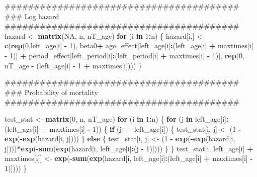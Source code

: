 \documentclass[11pt,]{article}
\newenvironment{Shaded}{\begin{snugshade}}{\end{snugshade}}
\newcommand{\KeywordTok}[1]{\textcolor[rgb]{0.13,0.29,0.53}{\textbf{#1}}}
\newcommand{\DecValTok}[1]{\textcolor[rgb]{0.00,0.00,0.81}{#1}}
\newcommand{\StringTok}[1]{\textcolor[rgb]{0.31,0.60,0.02}{#1}}
\newcommand{\OtherTok}[1]{\textcolor[rgb]{0.56,0.35,0.01}{#1}}
\newcommand{\ControlFlowTok}[1]{\textcolor[rgb]{0.13,0.29,0.53}{\textbf{#1}}}
\newcommand{\OperatorTok}[1]{\textcolor[rgb]{0.81,0.36,0.00}{\textbf{#1}}}
\newcommand{\NormalTok}[1]{#1}
\begin{document}
\begin{Shaded}
\begin{Highlighting}[]
\NormalTok{  ########################################}
\NormalTok{  ### Log hazard}
\NormalTok{  ########################################}
\NormalTok{  hazard <-}\StringTok{ }\KeywordTok{matrix}\NormalTok{(}\OtherTok{NA}\NormalTok{, n, nT_age)}
  \ControlFlowTok{for}\NormalTok{ (i }\ControlFlowTok{in} \DecValTok{1}\OperatorTok{:}\NormalTok{n) \{}
\NormalTok{    hazard[i,] <-}\StringTok{ }\KeywordTok{c}\NormalTok{(}\KeywordTok{rep}\NormalTok{(}\DecValTok{0}\NormalTok{,left_age[i] }\OperatorTok{-}\StringTok{ }\DecValTok{1}\NormalTok{), beta0}\OperatorTok{+}
\StringTok{                      }\NormalTok{age_effect[left_age[i]}\OperatorTok{:}\NormalTok{(left_age[i] }\OperatorTok{+}\StringTok{ }\NormalTok{maxtimes[i] }\OperatorTok{-}\StringTok{ }\DecValTok{1}\NormalTok{)] }\OperatorTok{+}
\StringTok{                      }\NormalTok{period_effect[left_period[i]}\OperatorTok{:}\NormalTok{(left_period[i] }\OperatorTok{+}\StringTok{ }\NormalTok{maxtimes[i] }\OperatorTok{-}\StringTok{ }\DecValTok{1}\NormalTok{)],}
                      \KeywordTok{rep}\NormalTok{(}\DecValTok{0}\NormalTok{, nT_age }\OperatorTok{-}\StringTok{ }\NormalTok{(left_age[i] }\OperatorTok{-}\StringTok{ }\DecValTok{1} \OperatorTok{+}\StringTok{ }\NormalTok{maxtimes[i])))}
\NormalTok{  \}}

\NormalTok{  ########################################}
\NormalTok{  ### Probability of mortality}
\NormalTok{  ########################################}

\NormalTok{  test_stat <-}\StringTok{ }\KeywordTok{matrix}\NormalTok{(}\DecValTok{0}\NormalTok{, n, nT_age)}
  \ControlFlowTok{for}\NormalTok{ (i }\ControlFlowTok{in} \DecValTok{1}\OperatorTok{:}\NormalTok{n) \{}
    \ControlFlowTok{for}\NormalTok{ (j }\ControlFlowTok{in}\NormalTok{ left_age[i]}\OperatorTok{:}\NormalTok{(left_age[i] }\OperatorTok{+}\StringTok{ }\NormalTok{maxtimes[i] }\OperatorTok{-}\StringTok{ }\DecValTok{1}\NormalTok{)) \{}
      \ControlFlowTok{if}\NormalTok{ (j}\OperatorTok{==}\NormalTok{left_age[i]) \{}
\NormalTok{        test_stat[i, j] <-}\StringTok{ }\NormalTok{(}\DecValTok{1} \OperatorTok{-}\StringTok{ }\KeywordTok{exp}\NormalTok{(}\OperatorTok{-}\KeywordTok{exp}\NormalTok{(hazard[i, j])))}
\NormalTok{      \} }\ControlFlowTok{else}\NormalTok{ \{}
\NormalTok{        test_stat[i, j] <-}
\StringTok{          }\NormalTok{(}\DecValTok{1} \OperatorTok{-}\StringTok{ }\KeywordTok{exp}\NormalTok{(}\OperatorTok{-}\KeywordTok{exp}\NormalTok{(hazard[i, j])))}\OperatorTok{*}\KeywordTok{exp}\NormalTok{(}\OperatorTok{-}\KeywordTok{sum}\NormalTok{(}\KeywordTok{exp}\NormalTok{(hazard[i, left_age[i]}\OperatorTok{:}\NormalTok{(j }\OperatorTok{-}\StringTok{ }\DecValTok{1}\NormalTok{)])))}
\NormalTok{      \}}
\NormalTok{    \}}
\NormalTok{    test_stat[i, left_age[i] }\OperatorTok{+}\StringTok{ }\NormalTok{maxtimes[i]] <-}
\StringTok{          }\KeywordTok{exp}\NormalTok{(}\OperatorTok{-}\KeywordTok{sum}\NormalTok{(}\KeywordTok{exp}\NormalTok{(hazard[i, left_age[i]}\OperatorTok{:}\NormalTok{(left_age[i] }\OperatorTok{+}\StringTok{ }\NormalTok{maxtimes[i] }\OperatorTok{-}\StringTok{ }\DecValTok{1}\NormalTok{)])))}
\NormalTok{  \}}


\end{Highlighting}
\end{Shaded}
\end{document}
